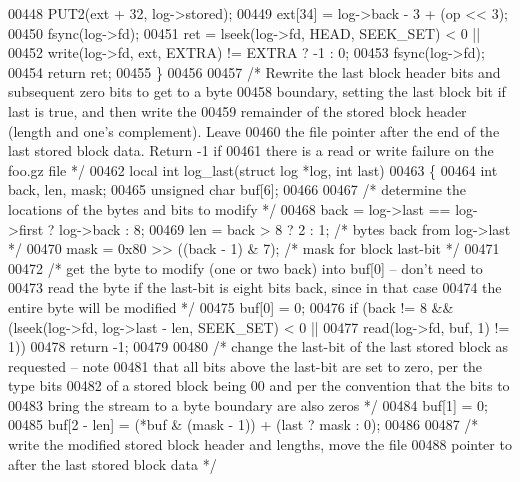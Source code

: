 \begin{DoxyCode}
00448     PUT2(ext + 32, log->stored);
00449     ext[34] = log->back - 3 + (op << 3);
00450     fsync(log->fd);
00451     ret = lseek(log->fd, HEAD, SEEK\_SET) < 0 ||
00452           write(log->fd, ext, EXTRA) != EXTRA ? -1 : 0;
00453     fsync(log->fd);
00454     \textcolor{keywordflow}{return} ret;
00455 \}
00456 
00457 \textcolor{comment}{/* Rewrite the last block header bits and subsequent zero bits to get to a byte}
00458 \textcolor{comment}{   boundary, setting the last block bit if last is true, and then write the}
00459 \textcolor{comment}{   remainder of the stored block header (length and one's complement).  Leave}
00460 \textcolor{comment}{   the file pointer after the end of the last stored block data.  Return -1 if}
00461 \textcolor{comment}{   there is a read or write failure on the foo.gz file */}
00462 local \textcolor{keywordtype}{int} log\_last(\textcolor{keyword}{struct} log *log, \textcolor{keywordtype}{int} last)
00463 \{
00464     \textcolor{keywordtype}{int} back, len, mask;
00465     \textcolor{keywordtype}{unsigned} \textcolor{keywordtype}{char} buf[6];
00466 
00467     \textcolor{comment}{/* determine the locations of the bytes and bits to modify */}
00468     back = log->last == log->first ? log->back : 8;
00469     len = back > 8 ? 2 : 1;                 \textcolor{comment}{/* bytes back from log->last */}
00470     mask = 0x80 >> ((back - 1) & 7);        \textcolor{comment}{/* mask for block last-bit */}
00471 
00472     \textcolor{comment}{/* get the byte to modify (one or two back) into buf[0] -- don't need to}
00473 \textcolor{comment}{       read the byte if the last-bit is eight bits back, since in that case}
00474 \textcolor{comment}{       the entire byte will be modified */}
00475     buf[0] = 0;
00476     \textcolor{keywordflow}{if} (back != 8 && (lseek(log->fd, log->last - len, SEEK\_SET) < 0 ||
00477                       read(log->fd, buf, 1) != 1))
00478         \textcolor{keywordflow}{return} -1;
00479 
00480     \textcolor{comment}{/* change the last-bit of the last stored block as requested -- note}
00481 \textcolor{comment}{       that all bits above the last-bit are set to zero, per the type bits}
00482 \textcolor{comment}{       of a stored block being 00 and per the convention that the bits to}
00483 \textcolor{comment}{       bring the stream to a byte boundary are also zeros */}
00484     buf[1] = 0;
00485     buf[2 - len] = (*buf & (mask - 1)) + (last ? mask : 0);
00486 
00487     \textcolor{comment}{/* write the modified stored block header and lengths, move the file}
00488 \textcolor{comment}{       pointer to after the last stored block data */}

\end{DoxyCode}
